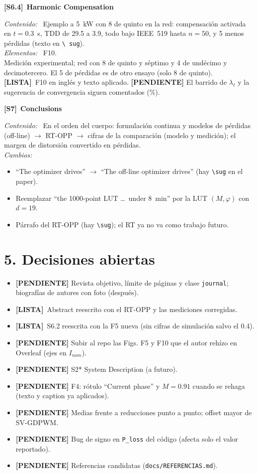 \documentclass[11pt,a4paper]{article}
\newcommand{\bloque}[2]{%
  \vspace{2mm}\noindent
  {\color{IDblue}\textbf{[#1]}}\ \textbf{#2}\par\vspace{0.5mm}}
\newcommand{\campo}[1]{\noindent\textit{#1:}\ }
\newcommand{\pendiente}[1]{{\color{Warn}\textbf{[PENDIENTE]} #1}}
\newcommand{\listo}{{\color{Done}\textbf{[LISTA]}}\ }
\newcommand{\pct}{\text{\char`\%}}
\begin{document}
\bloque{S6.4}{Harmonic Compensation}
\campo{Contenido} Ejemplo a 5~kW con 8\pct{} de quinto en la red:
compensación activada en $t=0.3$~s, TDD de 29.5\pct{} a 3.9\pct{}, todo bajo
IEEE~519 hasta $n=50$, y 5\pct{} menos pérdidas (texto en \texttt{\textbackslash
sug}).\\
\campo{Elementos} F10.\\
Medición experimental; red con 8\pct{} de quinto y séptimo y 4\pct{} de
undécimo y decimotercero. El 5\pct{} de pérdidas es de otro ensayo (solo
8\pct{} de quinto). \listo F10 en inglés y texto aplicado. \pendiente{El barrido de $\lambda_\ell$ y la
sugerencia de convergencia siguen comentados (\%).}

\bloque{S7}{Conclusions}
\campo{Contenido} En el orden del cuerpo: formulación continua y modelos de
pérdidas (off-line) $\rightarrow$ RT-OPP $\rightarrow$ cifras de la
comparación (modelo y medición); el margen de distorsión convertido en
pérdidas.\\
\campo{Cambios}
\begin{itemize}
\item ``The optimizer drives'' $\rightarrow$ ``The off-line optimizer
      drives'' (hay \texttt{\textbackslash sug} en el paper).
\item Reemplazar ``the 1000-point LUT \dots\ under 8~min'' por la LUT
      $(M,\varphi)$ con $d=19$.
\item Párrafo del RT-OPP (hay \texttt{\textbackslash sug}); el RT ya no va
      como trabajo futuro.
\end{itemize}

\section*{5. Decisiones abiertas}

\begin{itemize}
\item \pendiente{Revista objetivo, límite de páginas y clase
      \texttt{journal}; biografías de autores con foto (después).}
\item \listo Abstract reescrito con el RT-OPP y las mediciones corregidas.
\item \listo S6.2 reescrita con la F5 nueva (sin cifras de simulación salvo el 0.4\pct{}).
\item \pendiente{Subir al repo las Figs. F5 y F10 que el autor rehízo en Overleaf (ejes en $I_{nom}$).}
\item \pendiente{S2* System Description (a futuro).}
\item \pendiente{F4: rótulo ``Current phase'' y $M=0.91$ cuando se rehaga (texto y caption ya aplicados).}
\item \pendiente{Medias frente a reducciones punto a punto; offset mayor de
      SV-GDPWM.}
\item \pendiente{Bug de signo en \texttt{P\_loss} del código (afecta solo
      el valor reportado).}
\item \pendiente{Referencias candidatas (\texttt{docs/REFERENCIAS.md}).}
\end{itemize}
\end{document}
